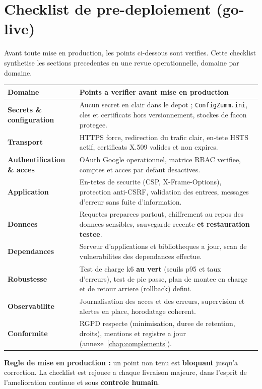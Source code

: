 \section{Checklist de pre-deploiement (go-live)}
Avant toute mise en production, les points ci-dessous sont verifies. Cette
checklist synthetise les sections precedentes en une revue operationnelle,
domaine par domaine.
\begin{xltabular}{\textwidth}{>{\bfseries}p{3.4cm} X}
\toprule
\textbf{Domaine} & \textbf{Points a verifier avant mise en production} \\
\midrule
\endhead
Secrets \& configuration & Aucun secret en clair dans le depot ; \texttt{ConfigZumm.ini}, cles et certificats hors versionnement, stockes de facon protegee. \\
Transport & HTTPS force, redirection du trafic clair, en-tete HSTS actif, certificats X.509 valides et non expires. \\
Authentification \& acces & OAuth Google operationnel, matrice RBAC verifiee, comptes et acces par defaut desactives. \\
Application & En-tetes de securite (CSP, X-Frame-Options), protection anti-CSRF, validation des entrees, messages d'erreur sans fuite d'information. \\
Donnees & Requetes preparees partout, chiffrement au repos des donnees sensibles, sauvegarde recente \textbf{et restauration testee}. \\
Dependances & Serveur d'applications et bibliotheques a jour, scan de vulnerabilites des dependances effectue. \\
Robustesse & Test de charge k6 \textbf{au vert} (seuils p95 et taux d'erreurs), test de pic passe, plan de montee en charge et de retour arriere (rollback) defini. \\
Observabilite & Journalisation des acces et des erreurs, supervision et alertes en place, horodatage coherent. \\
Conformite & RGPD respecte (minimisation, duree de retention, droits), mentions et registre a jour (annexe~\ref{chap:complements}). \\
\bottomrule
\end{xltabular}

\begin{encadre}
\textbf{Regle de mise en production :} un point non tenu est \textbf{bloquant}
jusqu'a correction. La checklist est rejouee a chaque livraison majeure, dans
l'esprit de l'amelioration continue et sous \textbf{controle humain}.
\end{encadre}


